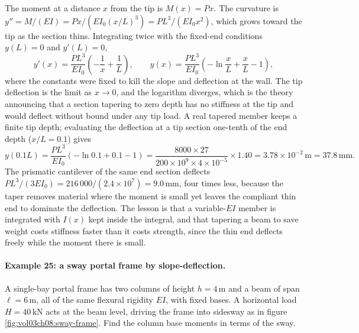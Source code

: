 The moment at a distance $x$ from the tip is $M(x) = Px$. The curvature
is $y'' = M/(EI) = Px/(E I_0 (x/L)^3) = P L^3/(E I_0 x^2)$, which grows
toward the tip as the section thins. Integrating twice with the fixed-end
conditions $y(L) = 0$ and $y'(L) = 0$,
\[
y'(x) = \frac{P L^3}{E I_0}\left(-\frac{1}{x} + \frac{1}{L}\right),
\qquad
y(x) = \frac{P L^3}{E I_0}\left(-\ln\frac{x}{L}
+ \frac{x}{L} - 1\right),
\]
where the constants were fixed to kill the slope and deflection at the
wall. The tip deflection is the limit as $x \to 0$, and the logarithm
diverges, which is the theory announcing that a section tapering to zero
depth has no stiffness at the tip and would deflect without bound under
any tip load. A real tapered member keeps a finite tip depth; evaluating
the deflection at a tip section one-tenth of the end depth ($x/L = 0.1$)
gives
\[
y(0.1L) = \frac{P L^3}{E I_0}\left(-\ln 0.1 + 0.1 - 1\right)
= \frac{8000 \times 27}{200 \times 10^9 \times 4 \times 10^{-5}}
\times 1.40 = 3.78 \times 10^{-2}\,\si{\meter} = 37.8\,\si{\milli\meter}.
\]
The prismatic cantilever of the same end section deflects $PL^3/(3EI_0)
= 216\,000/(2.4 \times 10^7) = 9.0\,\si{\milli\meter}$, four times less,
because the taper removes material where the moment is small yet leaves
the compliant thin end to dominate the deflection. The lesson is that a
variable-$EI$ member is integrated with $I(x)$ kept inside the integral,
and that tapering a beam to save weight costs stiffness faster than it
costs strength, since the thin end deflects freely while the moment
there is small.

\paragraph{Example 25: a sway portal frame by slope-deflection.} A
single-bay portal frame has two columns of height $h = 4\,\si{\meter}$
and a beam of span $\ell = 6\,\si{\meter}$, all of the same flexural
rigidity $EI$, with fixed bases. A horizontal load $H = 40\,\text{kN}$
acts at the beam level, driving the frame into sidesway as in figure
\ref{fig:vol03ch08:sway-frame}. Find the column base moments in terms of
the sway.


